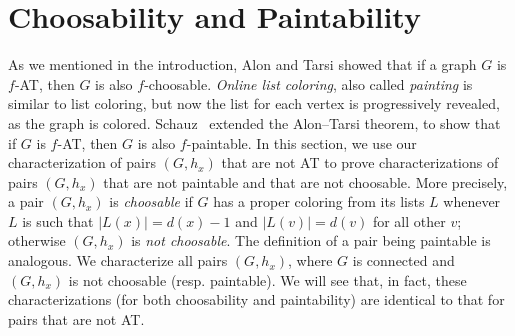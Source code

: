 \documentclass[12pt]{article}
\theoremstyle{plain}
\newtheorem{lem}[thm]{Lemma}
\theoremstyle{definition}
\newtheorem{defn}{Definition}
\theoremstyle{remark}
\newcommand{\fancy}[1]{\mathcal{#1}}
\newcommand{\parens}[1]{\left( #1 \right)}
\def\B{\fancy{B}}
\begin{document}
%

\section{Choosability and Paintability}
\label{sec:extensions}
As we mentioned in the introduction, Alon and Tarsi showed that if a graph $G$
is $f$-AT, then $G$ is also $f$-choosable.  \emph{Online list coloring}, also
called \emph{painting} is similar to list coloring, but now the list for each
vertex is progressively revealed, as the graph is colored. 
Schauz~\cite{schauz2010flexible} extended the Alon--Tarsi theorem, to show that
if $G$ is $f$-AT, then $G$ is also $f$-paintable.  In this section, we use our
characterization of pairs $(G,h_x)$ that are not AT to prove characterizations
of pairs $(G,h_x)$ that are not paintable and that are not choosable.  More
precisely, a pair $(G,h_x)$ is \emph{choosable} if $G$ has a proper coloring
from its lists $L$ whenever $L$ is such that $|L(x)|=d(x)-1$ and $|L(v)|=d(v)$
for all other $v$; otherwise $(G,h_x)$ is \emph{not choosable}.  The definition
of a pair being paintable is analogous.  We characterize all pairs $(G,h_x)$,
where $G$ is connected and $(G,h_x)$ is not choosable (resp. paintable).  We
will see that, in fact, these characterizations (for both choosability and
paintability) are identical to that for pairs that are not AT.  
\end{document}
